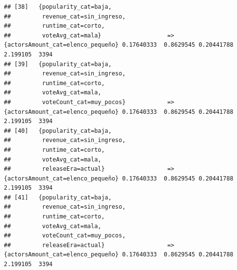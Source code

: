 \documentclass[
]{article}
\begin{document}
\begin{verbatim}
## [38]   {popularity_cat=baja,                                                                                                    
##         revenue_cat=sin_ingreso,                                                                                                
##         runtime_cat=corto,                                                                                                      
##         voteAvg_cat=mala}                   => {actorsAmount_cat=elenco_pequeño} 0.17640333  0.8629545 0.20441788 2.199105  3394
## [39]   {popularity_cat=baja,                                                                                                    
##         revenue_cat=sin_ingreso,                                                                                                
##         runtime_cat=corto,                                                                                                      
##         voteAvg_cat=mala,                                                                                                       
##         voteCount_cat=muy_pocos}            => {actorsAmount_cat=elenco_pequeño} 0.17640333  0.8629545 0.20441788 2.199105  3394
## [40]   {popularity_cat=baja,                                                                                                    
##         revenue_cat=sin_ingreso,                                                                                                
##         runtime_cat=corto,                                                                                                      
##         voteAvg_cat=mala,                                                                                                       
##         releaseEra=actual}                  => {actorsAmount_cat=elenco_pequeño} 0.17640333  0.8629545 0.20441788 2.199105  3394
## [41]   {popularity_cat=baja,                                                                                                    
##         revenue_cat=sin_ingreso,                                                                                                
##         runtime_cat=corto,                                                                                                      
##         voteAvg_cat=mala,                                                                                                       
##         voteCount_cat=muy_pocos,                                                                                                
##         releaseEra=actual}                  => {actorsAmount_cat=elenco_pequeño} 0.17640333  0.8629545 0.20441788 2.199105  3394

\end{verbatim}
\end{document}
